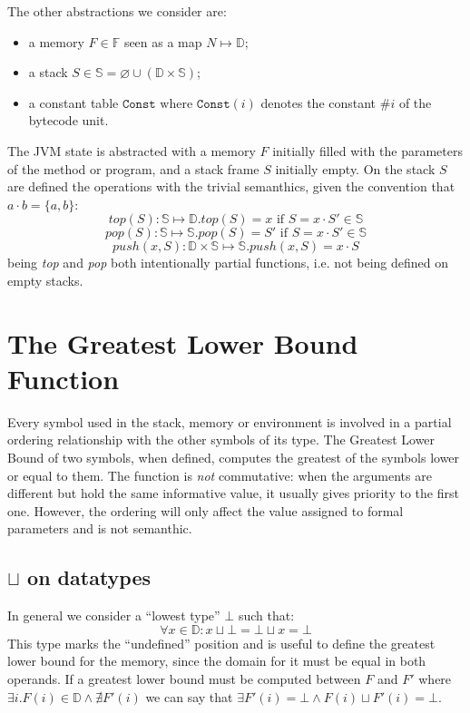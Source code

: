 \documentclass{amsart}
\newcommand{\bF}{\mathbb{F}}
\newcommand{\bS}{\mathbb{S}}
\newcommand{\data}{\mathbb{D}}
\newcommand{\Const}{\texttt{Const}}
\renewcommand{\emptyset}{\varnothing}
\numberwithin{equation}{section}
\theoremstyle{plain} %
\theoremstyle{definition}
\theoremstyle{remark}
\begin{document}
The other abstractions we consider are:
\begin{itemize}
\item a memory $F \in \bF{}$ seen as a map $N \mapsto \data{}$;
\item a stack $S \in \bS{} = \emptyset \cup (\data{} \times \bS{})$;
\item a constant table $\Const{} \text{ where } \Const{}(i)$ denotes the constant $\#i$ of the bytecode unit.
\end{itemize}
The JVM state is abstracted with a memory $F$ initially filled with the parameters of the method or program, and a stack frame $S$ initially empty. On the stack $S$ are defined the operations with the trivial semanthics, given the convention that $a\cdot b = \{a, b\} $:
\[
top(S): \bS{} \mapsto \data{}.top(S) = x \text{ if } S = x \cdot S' \in \bS{}
\]\[pop(S): \bS{} \mapsto \bS{}.pop(S) = S' \text{ if } S = x \cdot S' \in \bS{}
\]\[push(x, S): \data{} \times \bS{} \mapsto \bS{}.push(x, S) = x \cdot S
\]
being \emph{top} and \emph{pop} both intentionally partial functions, i.e. not being defined on empty stacks.\\


\section{The Greatest Lower Bound Function}

Every symbol used in the stack, memory or environment is involved in a partial ordering relationship with the other symbols of its type. The Greatest Lower Bound of two symbols, when defined, computes the greatest of the symbols lower or equal to them. The function is \emph{not} commutative: when the arguments are different but hold the same informative value, it usually gives priority to the first one. However, the ordering will only affect the value assigned to formal parameters and is not semanthic.

\subsection{$\sqcup$ on datatypes}
In general we consider a ``lowest type'' $\bot$ such that:
\[ \forall x \in \data{}: x \sqcup \bot = \bot \sqcup x = \bot \]
This type marks the ``undefined'' position and is useful to define the greatest lower bound for the memory, since the domain for it must be equal in both operands. If a greatest lower bound must be computed between $F$ and $F'$ where $\exists i. F(i) \in \data{} \wedge \nexists F'(i)$ we can say that $\exists F'(i) = \bot \wedge F(i) \sqcup F'(i) = \bot$.\\
\end{document}

